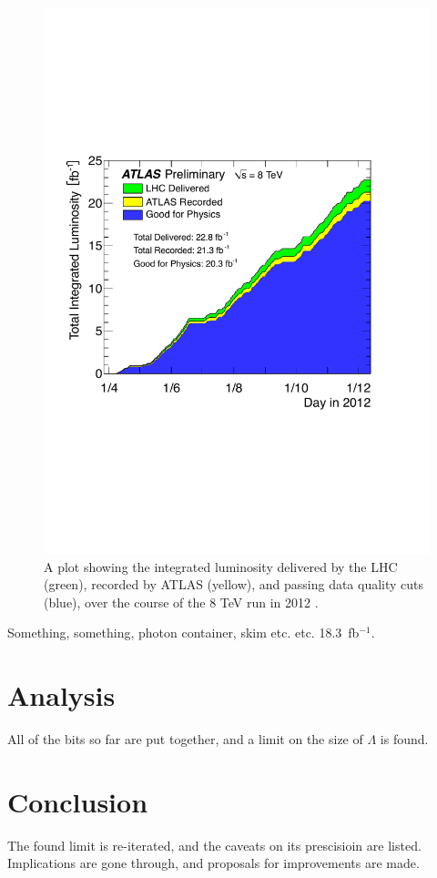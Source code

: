 \begin{english}
\begin{figure}[hbt]
\begin{minipage}[b]{.69\textwidth}
\hspace{-1em}\includegraphics[width=\textwidth]{figures/intlumi}
\end{minipage}\hfill\begin{minipage}[b]{.3\textwidth}
\caption{A plot showing the integrated luminosity delivered by the LHC (green), recorded by ATLAS (yellow), and passing data quality cuts (blue), over the course of the 8 TeV run in 2012 \cite{publiclumi}.
\label{intlumi}}
\end{minipage}
\end{figure}

Something, something, photon container, skim etc. etc. 18.3~fb$^{-1}$.

\chapter{Analysis}
All of the bits so far are put together, and a limit on the size of
$\Lambda$ is found.

\chapter{Conclusion}
The found limit is re-iterated, and the caveats on its prescisioin are
listed. Implications are gone through, and proposals for improvements
are made.

\renewcommand{\bibname}{References}



\end{english}

